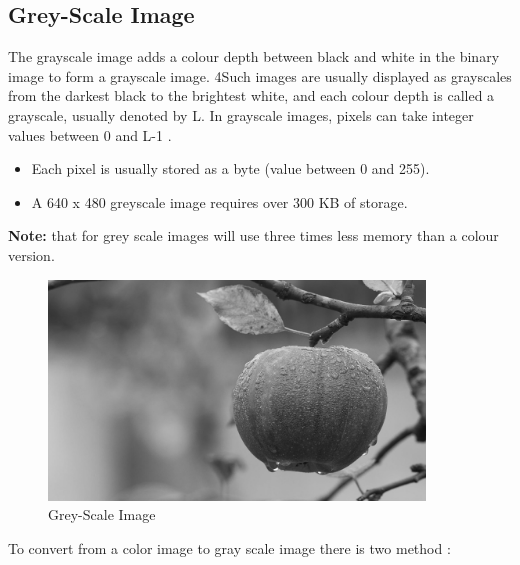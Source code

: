 \subsection{Grey-Scale Image}
The grayscale image adds a colour depth between black and white in the binary image to form a grayscale image.
4Such images are usually displayed as grayscales from the darkest black to the brightest white, and each colour
depth is called a grayscale, usually denoted by L. In grayscale images, pixels can take integer values between 0 and L-1 \cite{1.6}.

        \begin{itemize}
                \item Each pixel is usually stored as a byte (value between 0 and 255).
                \item A 640 x 480 greyscale image requires over 300 KB of storage.
        \end{itemize}
\textbf{Note:}  that for grey scale images will use three times less memory than a colour version.

        \begin{figure}[h]
                \centering
                \includegraphics[width=10cm]{chapiter1/figures/grey-scal.png}
                \setlength{\fboxrule}{2pt}
                \caption{Grey-Scale Image}
                \label{fig:figure1.5}
        \end{figure}

To convert from a color image to gray scale image there is two method \cite{1.7}:

